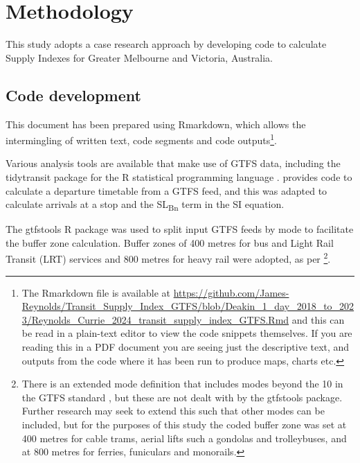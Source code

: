 \documentclass[]{tufte-book}
\begin{document}
\hypertarget{methodology}{%
\chapter{Methodology}\label{methodology}}

This study adopts a case research approach by developing code to
calculate Supply Indexes for Greater Melbourne and Victoria, Australia.

\hypertarget{code-development}{%
\section{Code development}\label{code-development}}

This document has been prepared using Rmarkdown, which allows the
intermingling of written text, code segments and code
outputs\footnote{The Rmarkdown file is available at
  \url{https://github.com/James-Reynolds/Transit_Supply_Index_GTFS/blob/Deakin_1_day_2018_to_2023/Reynolds_Currie_2024_transit_supply_index_GTFS.Rmd}
  and this can be read in a plain-text editor to view the code snippets
  themselves. If you are reading this in a PDF document you are seeing
  just the descriptive text, and outputs from the code where it has been
  run to produce maps, charts etc.}.

Various analysis tools are available that make use of GTFS data,
including the tidytransit package \citep{R-tidytransit} for the R
statistical programming language \citep{R-base}.
\citet{tidytransit_departure_timetable} provides code to calculate a
departure timetable from a GTFS feed, and this was adapted to calculate
arrivals at a stop and the SL\textsubscript{Bn} term in the
\citet{currie2007identifying} SI equation.

The gtfstools R package \citep{R-gtfstools} was used to split input GTFS
feeds by mode to facilitate the buffer zone calculation. Buffer zones of
400 metres for bus and Light Rail Transit (LRT) services and 800 metres
for heavy rail were adopted, as per
\citet{currie2007identifying}\footnote{There is an extended mode
  definition that includes modes beyond the 10 in the GTFS standard
  \citep{filter_GTFS_by_mode}, but these are not dealt with by the
  gtfstools package. Further research may seek to extend this such that
  other modes can be included, but for the purposes of this study the
  coded buffer zone was set at 400 metres for cable trams, aerial lifts
  such a gondolas and trolleybuses, and at 800 metres for ferries,
  funiculars and monorails.}.
\end{document}
